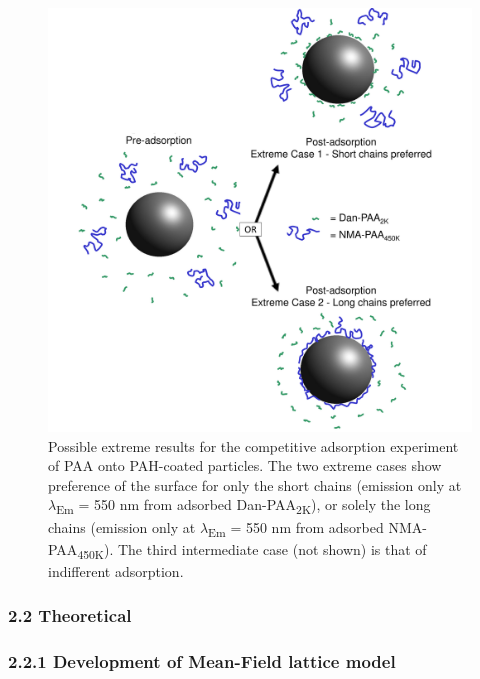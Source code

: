 \documentclass[journal=mamobx,manuscript=article]{achemso}
\begin{document}
\begin{figure}[H]
\includegraphics[scale=0.15]{extremes.pdf}
\caption{Possible extreme results for the competitive adsorption experiment of PAA onto PAH-coated particles.  The two extreme cases show preference of the surface for only the short chains (emission only at $\lambda$\textsubscript{Em} = 550 nm from adsorbed Dan-PAA\textsubscript{2K}), or solely the long chains (emission only at $\lambda$\textsubscript{Em} = 550 nm from adsorbed NMA-PAA\textsubscript{450K}).  The third intermediate case (not shown) is that of indifferent adsorption.}
\label{figure 4}
\end{figure}


\subsubsection{2.2  Theoretical}   %
    \label{sec-meth-theor}

\subsubsection{2.2.1 Development of Mean-Field lattice model}   %
   \label{sec-devMF}
\end{document}
